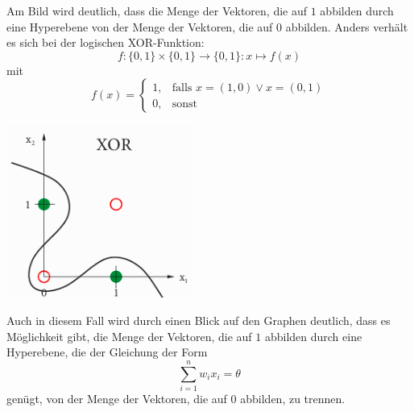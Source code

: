 \documentclass[a4paper]{scrartcl}
\newenvironment{Figure}
  {\par\medskip\noindent\minipage{\linewidth}}
  {\endminipage\par\medskip}
\begin{document}
\begin{multicols}{2}
\begin{Figure}
                        \end{Figure}
                        Am Bild wird deutlich, dass die Menge der Vektoren, die auf $1$ abbilden durch eine Hyperebene von der Menge der Vektoren, die auf $0$ abbilden.
                        \newline
                        Anders verhält es sich bei der logischen XOR-Funktion:
                        $$
                            f:\{0,1\}\times\{0,1\}\rightarrow\{0,1\}: x\mapsto f(x)
                        $$
                        mit
                        $$
                            f(x)=\left\{\begin{array}{cl} 1, & \mbox{falls }x=(1,0) \vee x = (0,1)\\
                            0, & \mbox{sonst}\end{array}\right. 
                        $$
                        \begin{Figure}
                            \centering
                            \includegraphics[width=\linewidth]{XOR.png}
                        \end{Figure}
                        Auch in diesem Fall wird durch einen Blick auf den Graphen deutlich, dass es Möglichkeit gibt, die Menge der Vektoren, die auf $1$ abbilden durch eine Hyperebene, die der Gleichung der Form
                        $$
                            \sum_{i=1}^nw_ix_i = \theta
                        $$
                        genügt, von der Menge der Vektoren, die auf $0$ abbilden, zu trennen.
                        

\end{multicols}
\end{document}
